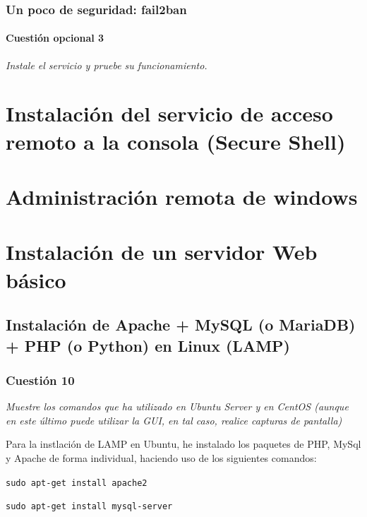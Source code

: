 \subsubsection{Un poco de seguridad: fail2ban}
\paragraph{Cuestión opcional 3}
\textit{Instale el servicio y pruebe su funcionamiento.}


\section{Instalación del servicio de acceso remoto a la consola (Secure Shell)}


\section{Administración remota de windows}


\section{Instalación de un servidor Web básico}

\subsection{Instalación de Apache + MySQL (o MariaDB) + PHP (o Python) en Linux (LAMP)}

\subsubsection{Cuestión 10}
\textit{Muestre los comandos que ha utilizado en Ubuntu Server y en CentOS (aunque en este último puede utilizar la GUI, en tal caso, realice capturas de pantalla)}
\newline

Para la instlación de LAMP en Ubuntu, he instalado los paquetes de  PHP, MySql y Apache de forma individual, haciendo uso de los siguientes comandos: \cite{l1 ,l2 ,l3} \newline

\hskip3.5cm \texttt{sudo apt-get install apache2 }

\hskip3.5cm \texttt{sudo apt-get install mysql-server }

